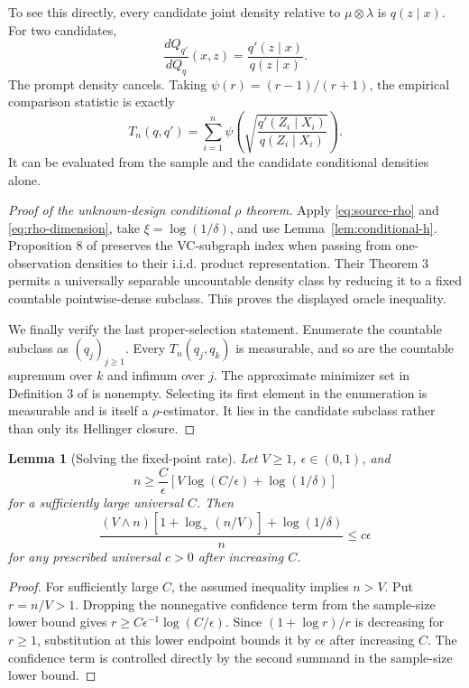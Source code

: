 \documentclass[twoside]{article}
\newtheorem{lemma}[theorem]{Lemma}
\begin{document}
To see this directly, every candidate joint density relative to $\mu\otimes\lambda$ is $q(z\mid x)$. For two candidates,
\[
 \frac{dQ_{q'}}{dQ_q}(x,z)=\frac{q'(z\mid x)}{q(z\mid x)}.
\]
The prompt density cancels. Taking $\psi(r)=(r-1)/(r+1)$, the empirical comparison statistic is exactly
\[
 T_n(q,q')=\sum_{i=1}^n\psi\!\left(
 \sqrt{\frac{q'(Z_i\mid X_i)}{q(Z_i\mid X_i)}}
 \right).
\]
It can be evaluated from the sample and the candidate conditional densities alone.

\begin{proof}[Proof of the unknown-design conditional $\rho$ theorem]
Apply \eqref{eq:source-rho} and \eqref{eq:rho-dimension}, take $\xi=\log(1/\delta)$, and use Lemma~\ref{lem:conditional-h}. Proposition 8 of \citet{baraud2018} preserves the VC-subgraph index when passing from one-observation densities to their i.i.d. product representation. Their Theorem 3 permits a universally separable uncountable density class by reducing it to a fixed countable pointwise-dense subclass. This proves the displayed oracle inequality.

We finally verify the last proper-selection statement. Enumerate the countable subclass as $(q_j)_{j\geq1}$. Every $T_n(q_j,q_k)$ is measurable, and so are the countable supremum over $k$ and infimum over $j$. The approximate minimizer set in Definition 3 of \citet{baraud2018} is nonempty. Selecting its first element in the enumeration is measurable and is itself a $\rho$-estimator. It lies in the candidate subclass rather than only its Hellinger closure.
\end{proof}

\begin{lemma}[Solving the fixed-point rate]
\label{lem:fixed-point}
Let $V\geq1$, $\epsilon\in(0,1)$, and
\[
 n\geq\frac{C}{\epsilon}\left[V\log(C/\epsilon)+\log(1/\delta)\right]
\]
for a sufficiently large universal $C$. Then
\[
 \frac{(V\wedge n)[1+\log_+(n/V)]+\log(1/\delta)}{n}
 \leq c\epsilon
\]
for any prescribed universal $c>0$ after increasing $C$.
\end{lemma}

\begin{proof}
For sufficiently large $C$, the assumed inequality implies $n>V$. Put $r=n/V>1$. Dropping the nonnegative confidence term from the sample-size lower bound gives $r\geq C\epsilon^{-1}\log(C/\epsilon)$. Since $(1+\log r)/r$ is decreasing for $r\geq1$, substitution at this lower endpoint bounds it by $c\epsilon$ after increasing $C$. The confidence term is controlled directly by the second summand in the sample-size lower bound.
\end{proof}
\end{document}
